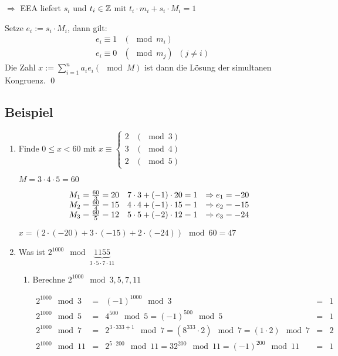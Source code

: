 $\Rightarrow$ EEA liefert $s_i$ und $t_i \in \mathbb{Z}$ mit $t_i \cdot m_i + s_i \cdot M_i = 1$

Setze $e_i := s_i \cdot M_i$, dann gilt:
\[\begin{array}{ll}
	e_i \equiv 1	& (\mod m_i) \\
	e_i \equiv 0 	& (\mod m_j) \;\; (j \neq i)
\end{array}\]
%
Die Zahl $x := \sum_{i=1}^{n}a_ie_i (\mod M)$ ist dann die Lösung der simultanen Kongruenz. \qed

\subsection{Beispiel}

\begin{enumerate}

	\item
	Finde $0 \leq x < 60$ mit 
	$x \equiv \begin{cases}
	2 & (\mod 3) \\
	3 & (\mod 4) \\
	2 & (\mod 5)
	\end{cases}$
	
	$M = 3 \cdot 4 \cdot 5 = 60$
	
	\[\begin{array}{lr@{\quad\Rightarrow\;}l}
	M_1 = \frac{60}{3} = 20 & 7 \cdot 3 + (-1) \cdot 20 = 1	& e_1 = -20 \\
	M_2 = \frac{60}{4} = 15 & 4 \cdot 4 + (-1) \cdot 15 = 1	& e_2 = -15 \\
	M_3 = \frac{60}{5} = 12	& 5 \cdot 5 + (-2) \cdot 12 = 1	& e_3 = -24
	\end{array}\]
	
	$x = (2 \cdot (-20) + 3 \cdot (-15) + 2 \cdot (-24)) \mod 60 = 47$
	
	\item
	Was ist $2^{1000} \mod \underbrace{1155}_{3 \cdot 5 \cdot 7 \cdot 11}$
	
	\begin{enumerate}
		\item
		Berechne $2^{1000} \mod 3, 5, 7, 11$
		
		$\begin{array}{lcrcl}
		2^{1000} \mod 3 &=& (-1)^{1000} \mod 3 &=& 1 \\
		2^{1000} \mod 5 &=& 4^{500} \mod 5 = (-1)^{500} \mod 5 &=& 1 \\
		2^{1000} \mod 7 &=& 2^{3 \cdot 333+1} \mod 7 = (8^{333} \cdot 2) \mod 7 = (1 \cdot 2) \mod 7 &=& 2 \\
		2^{1000} \mod 11 &=& 2^{5 \cdot 200} \mod 11 = 32^{200} \mod 11 = (-1)^{200} \mod 11 &=& 1
		\end{array}$
		

\end{enumerate}
\end{enumerate}
